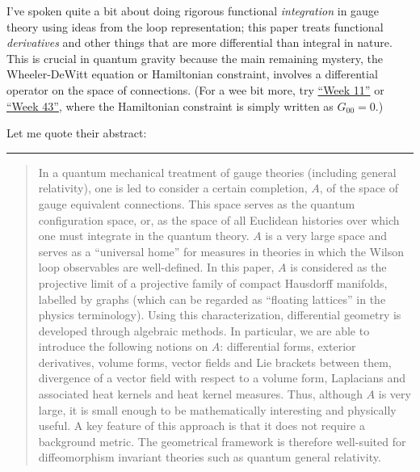 \documentclass{article}
\def\tightlist{}
\renewcommand{\texttt}[1]{%
  \begingroup
  \ttfamily
  \begingroup\lccode`~=`/\lowercase{\endgroup\def~}{/\discretionary{}{}{}}%
  \begingroup\lccode`~=`[\lowercase{\endgroup\def~}{[\discretionary{}{}{}}%
  \begingroup\lccode`~=`.\lowercase{\endgroup\def~}{.\discretionary{}{}{}}%
  \catcode`/=\active\catcode`[=\active\catcode`.=\active
  \scantokens{#1\noexpand}%
  \endgroup
}
\begin{document}

I've spoken quite a bit about doing rigorous functional
\emph{integration} in gauge theory using ideas from the loop
representation; this paper treats functional \emph{derivatives} and
other things that are more differential than integral in nature. This is
crucial in quantum gravity because the main remaining mystery, the
Wheeler-DeWitt equation or Hamiltonian constraint, involves a
differential operator on the space of connections. (For a wee bit more,
try \protect\hyperlink{week11}{``Week 11''} or
\protect\hyperlink{week43}{``Week 43''}, where the Hamiltonian
constraint is simply written as \(G_{00} = 0\).)

Let me quote their abstract:

\begin{center}\rule{0.5\linewidth}{0.5pt}\end{center}

\begin{quote}
In a quantum mechanical treatment of gauge theories (including general
relativity), one is led to consider a certain completion, \(A\), of the
space of gauge equivalent connections. This space serves as the quantum
configuration space, or, as the space of all Euclidean histories over
which one must integrate in the quantum theory. \(A\) is a very large
space and serves as a ``universal home'' for measures in theories in
which the Wilson loop observables are well-defined. In this paper, \(A\)
is considered as the projective limit of a projective family of compact
Hausdorff manifolds, labelled by graphs (which can be regarded as
``floating lattices'' in the physics terminology). Using this
characterization, differential geometry is developed through algebraic
methods. In particular, we are able to introduce the following notions
on \(A\): differential forms, exterior derivatives, volume forms, vector
fields and Lie brackets between them, divergence of a vector field with
respect to a volume form, Laplacians and associated heat kernels and
heat kernel measures. Thus, although \(A\) is very large, it is small
enough to be mathematically interesting and physically useful. A key
feature of this approach is that it does not require a background
metric. The geometrical framework is therefore well-suited for
diffeomorphism invariant theories such as quantum general relativity.
\end{quote}
\end{document}
